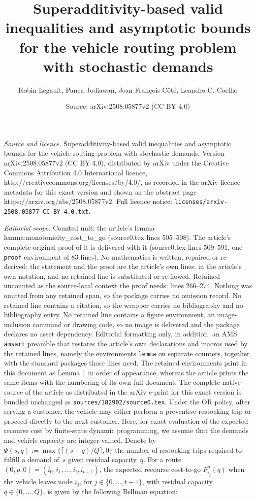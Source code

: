 \documentclass[10pt,a4paper]{amsart}
\title{Superadditivity-based valid inequalities and asymptotic bounds for the vehicle routing problem with stochastic demands}
\author{Robin Legault, Panca Jodiawan, Jean-Fran\c{c}ois C\^ot\'e, Leandro C. Coelho}
\date{Source: arXiv:2508.05877v2 (CC BY 4.0)}
\newcommand{\rev}[1]{{\color{black}#1}}
\begin{document}
\maketitle

\noindent\emph{Source and licence.} Superadditivity-based valid inequalities and asymptotic bounds for the vehicle routing problem with stochastic demands. Version arXiv:2508.05877v2 (CC BY 4.0), distributed by arXiv under the Creative Commons Attribution 4.0 International licence, http://creativecommons.org/licenses/by/4.0/, as recorded in the arXiv licence metadata for this exact version and shown on the abstract page https://arxiv.org/abs/2508.05877v2. Full licence notice: \texttt{licenses/arxiv-2508.05877-CC-BY-4.0.txt}.\par\smallskip

\noindent\textit{Editorial scope.} Counted unit: the article's lemma lemma:monotonicity\_cost\_to\_go (source0.tex lines 505--508). The article's complete original proof of it is delivered with it (source0.tex lines 509--591, one \texttt{proof} environment of 83 lines). No mathematics is written, repaired or re-derived: the statement and the proof are the article's own lines, in the article's own notation, and no retained line is substituted or re-flowed.  Retained uncounted as the source-local context the proof needs: lines 266--274.  Nothing was omitted from any retained span, so the package carries no omission record.  No retained line contains a citation, so the wrapper carries no bibliography and no bibliography entry.  No retained line contains a figure environment, an image-inclusion command or drawing code, so no image is delivered and the package declares no asset dependency.  Editorial formatting only, in addition: an AMS \texttt{amsart} preamble that restates the article's own declarations and macros used by the retained lines, namely the environments \texttt{lemma} on separate counters, together with the standard packages those lines need.  The retained environments print in this document as Lemma 1 in order of appearance, whereas the article prints the same items with the numbering of its own full document.  The complete native source of the article as distributed in the arXiv e-print for this exact version is bundled unchanged as \texttt{sources/182902/source0.tex}.
\rev{Under the OR policy, after serving a customer, the vehicle may either perform a preventive restocking trip or proceed directly to the next customer. Here, for exact evaluation of the expected recourse cost by finite-state dynamic programming, we assume that the demands and vehicle capacity are integer-valued.} Denote by $\Psi(s,q) := \max\{\lceil(s - q)/Q\rceil,0\}$ the number of restocking trips required to fulfill a demand of~$s$ given residual capacity~$q$. For a route $(0, p, 0) = (i_0, i_{1}, \dots, i_{t}, i_{t+1})$, the expected recourse cost-to-go $F^{p}_{i_{j}}(q)$ when the vehicle leaves node $i_{j}$, for $j \in \{0,\dots,t{-}1\}$, with residual capacity $q \in \{0,\dots,Q\}$, is given by the following Bellman equation:
\end{document}
